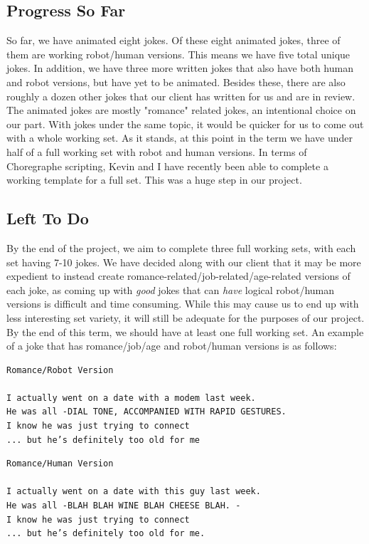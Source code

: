 \documentclass[onecolumn, draftclsnofoot,10pt, compsoc]{IEEEtran}
\begin{document}
\subsection{Progress So Far}
So far, we have animated eight jokes. Of these eight animated jokes, three of them are working robot/human versions. This means we have five total unique jokes. In addition, we have three more written jokes that also have both human and robot versions, but have yet to be animated. Besides these, there are also roughly a dozen other jokes that our client has written for us and are in review. The animated jokes are mostly "romance" related jokes, an intentional choice on our part. With jokes under the same topic, it would be quicker for us to come out with a whole working set. As it stands, at this point in the term we have under half of a full working set with robot and human versions. In terms of Choregraphe scripting, Kevin and I have recently been able to complete a working template for a full set. This was a huge step in our project.
\subsection{Left To Do}
By the end of the project, we aim to complete three full working sets, with each set having 7-10 jokes. We have decided along with our client that it may be more expedient to instead create romance-related/job-related/age-related versions of each joke, as coming up with \textit{good} jokes that can \textit{have} logical robot/human versions is difficult and time consuming. While this may cause us to end up with less interesting set variety, it will still be adequate for the purposes of our project. By the end of this term, we should have at least one full working set. An example of a joke that has romance/job/age and robot/human versions is as follows:


\begin{lstlisting}
Romance/Robot Version

I actually went on a date with a modem last week.
He was all -DIAL TONE, ACCOMPANIED WITH RAPID GESTURES.
I know he was just trying to connect
... but he’s definitely too old for me
\end{lstlisting}

\begin{lstlisting}
Romance/Human Version

I actually went on a date with this guy last week.
He was all -BLAH BLAH WINE BLAH CHEESE BLAH. -
I know he was just trying to connect
... but he’s definitely too old for me.
\end{lstlisting}
\end{document}
